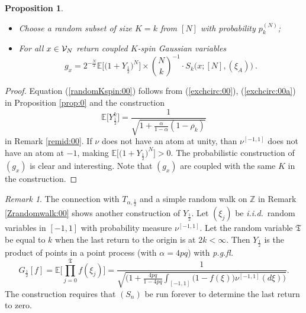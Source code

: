 \documentclass[preprint,11pt]{elsarticle}
\newtheorem{Proposition}{Proposition}
\theoremstyle{remark}
\newtheorem{Remark}{Remark}
\def\spin{{[-1,1]}}
\def\pgfl{\emph{p.g.fl.~}}
\def\iid{\emph{i.i.d.}~}
\begin{document}
{\begin{Proposition}
\begin{itemize}
\item[(a)]Choose a random subset of size $K=k$ from $[N]$ with probability $p_k^{(N)}$;
\item[(b)] For all $x\in {\cal V}_N$ return  coupled $K$-spin Gaussian variables
\begin{equation}
 g_x = 2^{-\frac{N}{2}}\mathbb{E}\big [\big ( 1 + Y_{ \frac{1}{2} }\big )^N\big ]\times
{N\choose k}^{-1}\cdot S_k\big (x;[N],(\xi_A)\big )\ .
\label{randomKspin:00}
\end{equation}
\end{itemize}
\end{Proposition}
\begin{proof}
Equation (\ref{randomKspin:00}) follows from (\ref{exchcirc:00}), (\ref{exchcirc:00a}) in Proposition \ref{prop:0}
and the construction
\[
\mathbb{E}\big [Y_{ \frac{1}{2} }^k\big ] = 
 \frac {1}{\sqrt{1 + \frac{\alpha}{1-\alpha}(1-\rho_k)}}
\]
in Remark \ref{remid:00}. If $\nu$ does not have an atom at unity, than $\nu^\spin$ does not have an atom at $-1$, making $\mathbb{E}\big [\big ( 1 + Y_{ \frac{1}{2} }\big )^N\big ]>0$.
The probabilistic construction of $(g_x)$ is clear and interesting. Note that $(g_x)$ are coupled with the same $K$ in the construction.
\end{proof}
\begin{Remark}
The connection with $T_{\alpha,\frac{1}{2}}$ and a simple random walk on $\mathbb{Z}$ in Remark \ref{Zrandomwalk:00} shows another construction of $Y_{\frac{1}{2}}$. Let $(\xi_j)$ be \iid random variables in $[-1,1]$ with probability measure $\nu^\spin$. Let the random variable ${\mathfrak T}$ be equal to $k$ when the last return to the origin is at $2k < \infty$. Then $Y_{\frac{1}{2}}$ is the product of points in a point process (with $\alpha = 4pq$) with \pgfl
\[
G_{\frac{1}{2}}[f] = \mathbb{E}\big [\prod_{j=0}^{\mathfrak T}f(\xi_j)\big ]
= \frac{1}{\sqrt{\Big (1+\frac{4pq}{1-4pq}\int_{[-1,1]}\big (1-f(\xi)\big)\nu^\spin(d\xi)\Big )}}.
\]
The construction requires that $(S_n)$ be run forever to determine the last return to zero.
\end{Remark}
}
\end{document}
